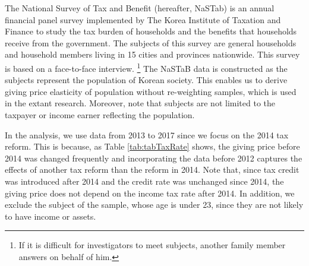 \documentclass[
  11pt,
  a4paper,
]{article}
\begin{document}
The National Survey of Tax and Benefit (hereafter, NaSTab) is
an annual financial panel survey
implemented by The Korea Institute of Taxation and Finance
to study the tax burden of households and the benefits
that households receive from the government.
The subjects of this survey are general households and
household members living in 15 cities and provinces nationwide.
This survey is based on a face-to-face interview. \footnote{If it is difficult for investigators to meet subjects, another family member answers on behalf of him.}
The NaSTaB data is constructed
as the subjects represent the population of Korean society.
This enables us to derive giving price elasticity of population
without re-weighting samples, which is used in the extant research.
Moreover, note that subjects are not limited to the taxpayer or
income earner reflecting the population.

In the analysis,
we use data from 2013 to 2017 since we focus on the 2014 tax reform.
This is because, as Table \ref{tab:tabTaxRate} shows,
the giving price before 2014 was changed frequently
and incorporating the data before 2012
captures the effects of another tax reform than the reform in 2014.
Note that, since tax credit was introduced after 2014 and
the credit rate was unchanged since 2014,
the giving price does not depend on the income tax rate after 2014.
In addition, we exclude the subject of the sample, whose age is under 23,
since they are not likely to have income or assets.
\end{document}
